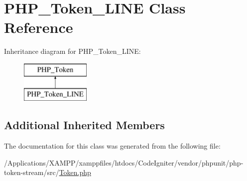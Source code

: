 \hypertarget{class_p_h_p___token___l_i_n_e}{}\section{P\+H\+P\+\_\+\+Token\+\_\+\+L\+I\+NE Class Reference}
\label{class_p_h_p___token___l_i_n_e}
Inheritance diagram for P\+H\+P\+\_\+\+Token\+\_\+\+L\+I\+NE\+:\begin{figure}[H]
\begin{center}
\leavevmode
\includegraphics[height=2.000000cm]{class_p_h_p___token___l_i_n_e}
\end{center}
\end{figure}
\subsection*{Additional Inherited Members}


The documentation for this class was generated from the following file\+:\begin{DoxyCompactItemize}
\item 
/\+Applications/\+X\+A\+M\+P\+P/xamppfiles/htdocs/\+Code\+Igniter/vendor/phpunit/php-\/token-\/stream/src/\mbox{\hyperlink{_token_8php}{Token.\+php}}\end{DoxyCompactItemize}
